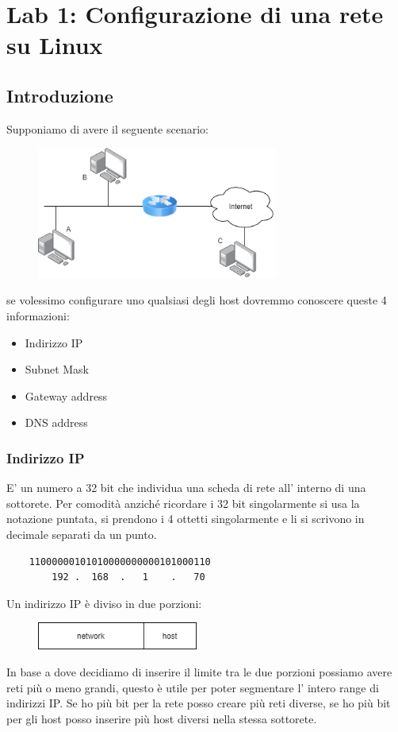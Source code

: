 \section{Lab 1: Configurazione di una rete su Linux}
\subsection{Introduzione}
Supponiamo di avere il seguente scenario:
\begin{figure}[H]
    \centering
    \includegraphics[width=300px]{images/1.1_Configurazione_di_una_rete_Linux/simple_network.png}
\end{figure}
se volessimo configurare uno qualsiasi degli host dovremmo conoscere queste 4 informazioni:
\begin{itemize}
    \item Indirizzo IP
    \item Subnet Mask
    \item Gateway address
    \item DNS address
\end{itemize}

\subsubsection{Indirizzo IP}
E' un numero a 32 bit che individua una scheda di rete all' interno di una sottorete.
Per comodità anziché ricordare i 32 bit singolarmente si usa la notazione puntata, si prendono i 4 ottetti singolarmente e li si scrivono in decimale separati da un punto.

\begin{verbatim}
    11000000101010000000000101000110
        192 .  168  .   1    .   70
\end{verbatim}
Un indirizzo IP è diviso in due porzioni:
\begin{figure}[H]
    \centering
    \includegraphics[width=200px]{images/1.1_Configurazione_di_una_rete_Linux/ip_parts.png}
\end{figure}
In base a dove decidiamo di inserire il limite tra le due porzioni possiamo avere reti più o meno grandi, questo è utile per poter segmentare l' intero range di indirizzi IP.
Se ho più bit per la rete posso creare più reti diverse, se ho più bit per gli host posso inserire più host diversi nella stessa sottorete.

